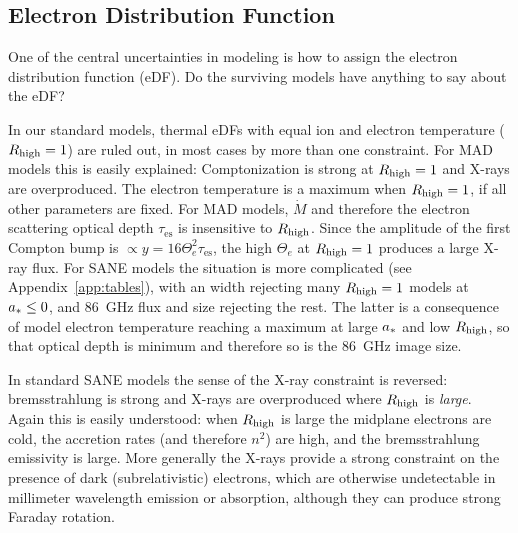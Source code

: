 
\subsection{Electron Distribution Function}

One of the central uncertainties in modeling \sgra is how to assign the electron distribution function (eDF).  Do the surviving models have anything to say about the eDF?

In our standard models, thermal eDFs with equal ion and electron temperature ($R_\mathrm{high} = 1$) are ruled out, in most cases by more than one constraint.  For MAD models this is easily explained: Comptonization is strong at $R_\mathrm{high} = 1$ and X-rays are overproduced.  The electron temperature is a maximum when $R_\mathrm{high} = 1$, if all other parameters are fixed. For MAD models, $\dot{M}$ and therefore the electron scattering optical depth $\tau_\mathrm{es}$ is insensitive to $R_\mathrm{high}$.  Since the amplitude of the first Compton bump is $\propto y = 16 \Theta_e^2 \tau_\mathrm{es}$, the high $\Theta_e$ at $R_\mathrm{high} = 1$ produces a large X-ray flux.  For SANE models the situation is more complicated (see Appendix~\ref{app:tables}), with an \mring width rejecting many $R_\mathrm{high} = 1$ models at $a_* \le 0$, and 86~GHz flux and size rejecting the rest.  The latter is a consequence of model electron temperature reaching a maximum at large $a_*$ and low $R_\mathrm{high}$, so that optical depth is minimum and therefore so is the 86~GHz image size.

In standard SANE models the sense of the X-ray constraint is reversed: bremsstrahlung is strong and X-rays are overproduced where $R_\mathrm{high}$ is {\em large}.  Again this is easily understood: when $R_\mathrm{high}$ is large the midplane electrons are cold, the accretion rates (and therefore $n^2$) are high, and the bremsstrahlung emissivity is large.  More generally the X-rays provide a strong constraint on the presence of dark (subrelativistic) electrons, which are otherwise undetectable in millimeter wavelength emission or absorption, although they can produce strong Faraday rotation.

